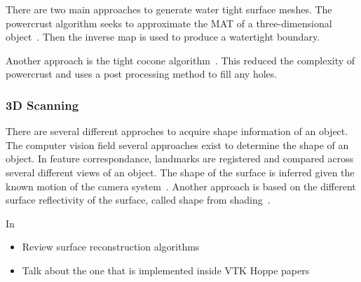 There are two main approaches to generate water tight surface meshes.
The powercrust algorithm seeks to approximate the \gls{MAT} of a three-dimensional object~\cite{amenta2001}.
Then the inverse map is used to produce a watertight boundary.

Another approach is the tight cocone algorithm~\cite{dey2006}.
This reduced the complexity of powercrust and uses a post processing method to fill any holes.

\subsubsection{3D Scanning}
There are several different approches to acquire shape information of an object.
The computer vision field several approaches exist to determine the shape of an object.
In feature correspondance, landmarks are registered and compared across several different  views of an object. 
The shape of the surface is inferred given the known motion of the camera system~\cite{szeliski2010}.
Another approach is based on the different surface reflectivity of the surface, called shape from shading~\cite{szeliski2010}.


In 
\begin{itemize}
    \item Review surface reconstruction algorithms
    \item Talk about the one that is implemented inside VTK Hoppe papers
\end{itemize}

